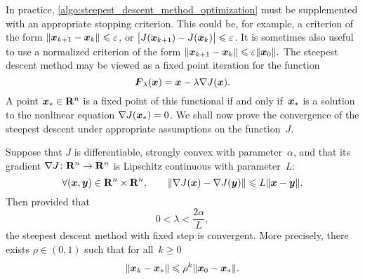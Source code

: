 In practice, \cref{algo:steepest_descent_method_optimization} must be supplemented with an appropriate stopping criterion.
This could be, for example, a criterion of the form $\lVert\mathbf{\boldsymbol{x}}_{k+1} - \mathbf{\boldsymbol{x}}_k\rVert \leqslant \varepsilon$,
or $\bigl\lvert J(\mathbf{\boldsymbol{x}}_{k+1}) - J(\mathbf{\boldsymbol{x}}_k) \bigr\rvert \leqslant \varepsilon$.
It is sometimes also useful to use a normalized criterion of the form $\lVert\mathbf{\boldsymbol{x}}_{k+1} - \mathbf{\boldsymbol{x}}_k\rVert \leqslant \varepsilon \lVert\mathbf{\boldsymbol{x}}_0\rVert.$
The steepest descent method may be viewed as a fixed point iteration for the function
\begin{equation}
    \label{eq:fixed_point_gradient_descent}
    \mathbf{\boldsymbol{F}}_{\lambda}(\mathbf{\boldsymbol{x}}) = \mathbf{\boldsymbol{x}} - \lambda \nabla J(\mathbf{\boldsymbol{x}}).
\end{equation}
A point $\mathbf{\boldsymbol{x}}_* \in \mathbf R^n$ is a fixed point of this functional if and only if~$\mathbf{\boldsymbol{x}}_*$ is a solution to the nonlinear equation $\nabla J(\mathbf{\boldsymbol{x}}_*) = 0$.
We shall now prove the convergence of the steepest descent under appropriate assumptions on the function~$J$.
\begin{theorem}
    \label{theorem:convergence_steepest_descent_optimization}
    Suppose that $J$ is differentiable, strongly convex with parameter~$\alpha$,
    and that its gradient $\nabla J \colon \mathbf R^n \to \mathbf R^n$ is Lipschitz continuous with parameter~$L$:
    \begin{equation}
        \label{eq:lipschitz_gradient}
        \forall (\mathbf{\boldsymbol{x}}, \mathbf{\boldsymbol{y}}) \in \mathbf R^n \times \mathbf R^n, \qquad
        \lVert\nabla J(\mathbf{\boldsymbol{x}}) - \nabla J(\mathbf{\boldsymbol{y}})\rVert \leqslant L \lVert\mathbf{\boldsymbol{x}} - \mathbf{\boldsymbol{y}}\rVert.
    \end{equation}
    Then provided that
    \begin{equation}
        \label{eq:condition_time_step}
        0 < \lambda < \frac{2 \alpha}{L},
    \end{equation}
    the steepest descent method with fixed step is convergent.
    More precisely,
    there exists $\rho \in (0, 1)$ such that for all~$k \geq 0$
    \begin{equation}
        \label{eq:exponential_convergence}
        \lVert\mathbf{\boldsymbol{x}}_k - \mathbf{\boldsymbol{x}}_*\rVert \leqslant \rho^k \lVert\mathbf{\boldsymbol{x}}_0 - \mathbf{\boldsymbol{x}}_*\rVert.
    \end{equation}
\end{theorem}
